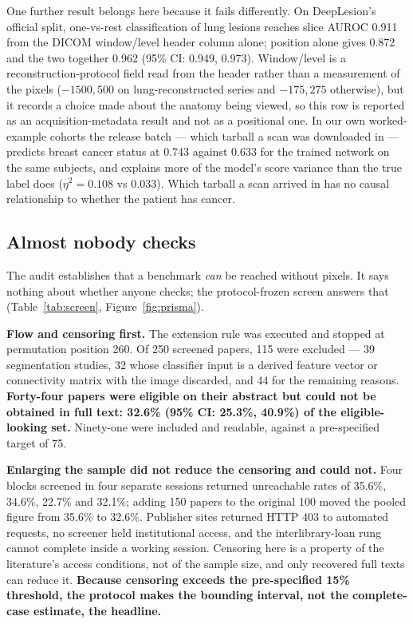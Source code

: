 \documentclass[11pt,a4paper]{article}
\begin{document}
One further result belongs here because it fails differently. On
DeepLesion's official split, one-vs-rest classification of lung lesions reaches
slice AUROC 0.911 from the DICOM window/level header column alone; position alone
gives 0.872 and the two together 0.962 (95\% CI: 0.949, 0.973). Window/level is a
reconstruction-protocol field read from the header rather than a measurement of the
pixels ($-1500, 500$ on lung-reconstructed series and $-175, 275$ otherwise), but it
records a choice made about the anatomy being viewed, so this row is reported as an
acquisition-metadata result and not as a positional one. In our own
worked-example cohorts the release batch --- which tarball a scan was downloaded
in --- predicts breast cancer status at 0.743 against 0.633 for the trained
network on the same subjects, and explains more of the model's score variance
than the true label does ($\eta^2=0.108$ vs 0.033). Which tarball a scan arrived
in has no causal relationship to whether the patient has cancer.

\subsection{Almost nobody checks}

The audit establishes that a benchmark \emph{can} be reached without pixels. It
says nothing about whether anyone checks; the protocol-frozen screen answers that
(Table~\ref{tab:screen}, Figure~\ref{fig:prisma}).

\textbf{Flow and censoring first.} The extension rule was executed and stopped at
permutation position 260. Of 250 screened papers, 115 were excluded --- 39
segmentation studies, 32 whose classifier input is a derived feature vector or
connectivity matrix with the image discarded, and 44 for the remaining reasons.
\textbf{Forty-four papers were eligible on their abstract but could not be
obtained in full text: 32.6\% (95\% CI: 25.3\%, 40.9\%) of the eligible-looking
set.} Ninety-one were included and readable, against a pre-specified target of
75.

\textbf{Enlarging the sample did not reduce the censoring and could not.} Four
blocks screened in four separate sessions returned unreachable rates of 35.6\%,
34.6\%, 22.7\% and 32.1\%; adding 150 papers to the original 100 moved the pooled
figure from 35.6\% to 32.6\%. Publisher sites returned HTTP 403 to automated
requests, no screener held institutional access, and the interlibrary-loan rung
cannot complete inside a working session. Censoring here is a property of the
literature's access conditions, not of the sample size, and only recovered full
texts can reduce it. \textbf{Because censoring exceeds the pre-specified 15\%
threshold, the protocol makes the bounding interval, not the complete-case
estimate, the headline.}
\end{document}
